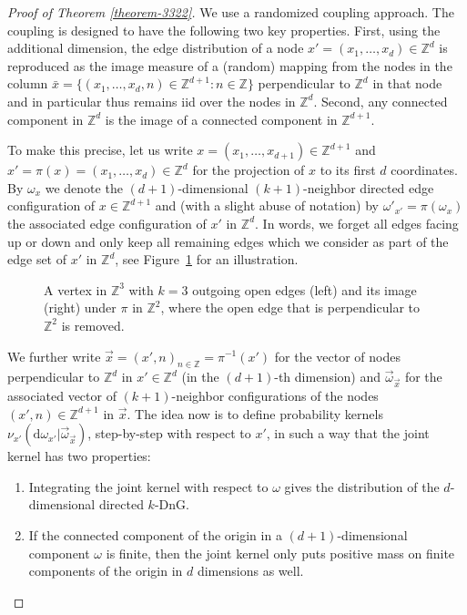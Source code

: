 \documentclass[a4paper, oneside, 11pt]{amsart}
\theoremstyle{definition}
\newcommand{\1}{\mathbbm{1}}
\newcommand{\0}{\mathbf{o}}
\renewcommand{\d}{\mathrm{d}}
\newcommand{\Z}{\mathbb{Z}}
\numberwithin{equation}{section}
\begin{document}
\begin{proof}[Proof of Theorem \ref{theorem-3322}]
    We use a randomized coupling approach. The coupling is designed to have the following two key properties. First, using the additional dimension, the edge distribution of a node $x'=(x_1,\dots,x_d)\in \Z^d$ is reproduced as the image measure of a (random) mapping from the nodes in the column $\bar x=\{(x_1,\dots,x_d,n)\in \Z^{d+1}\colon n\in \Z\}$ perpendicular to $\Z^d$ in that node and in particular thus remains iid over the nodes in $\Z^d$. Second, any connected component in $\Z^d$ is the image of a connected component in $\Z^{d+1}$.

To make this precise, let us write $x=(x_1,\dots,x_{d+1})\in \Z^{d+1}$ and $x'=\pi(x)=(x_1,\dots, x_d)\in \Z^d$ for the projection of $x$ to its first $d$ coordinates. By $\omega_{x}$ we denote the $(d+1)$-dimensional $(k+1)$-neighbor directed edge configuration of $x\in \Z^{d+1}$ and (with a slight abuse of notation) by $\omega'_{x'}=\pi(\omega_{x})$ the associated edge configuration of $x'$ in $\Z^d$. In words, we forget all edges facing up or down and only keep all remaining edges which we consider as part of the edge set of $x'$ in $\Z^d$, see Figure~\ref{fig_edgemap} for an illustration. 
\begin{figure}[h!]
\caption{A vertex in $\Z^3$ with $k=3$ outgoing open edges (left) and its image (right) under $\pi$ in $\Z^2$, where the open edge that is perpendicular to $\Z^2$ is removed.}\label{fig_edgemap}
\end{figure}



We further write $\vec{x}=(x',n)_{n\in\Z}=\pi^{-1}(x')$ for the vector of nodes perpendicular to $\Z^d$ in $x'\in\Z^d$ (in the $(d+1)$-th dimension) and $\vec\omega_{\vec x}$ for the associated vector of $(k+1)$-neighbor configurations of the nodes $(x',n)\in \Z^{d+1}$ in $\vec x$. The idea now is to define probability kernels $\nu_{x'}(\d \omega_{x'}|\vec\omega_{\vec x})$, step-by-step with respect to $x'$, in such a way that the joint kernel has two properties:
\begin{enumerate}
\item Integrating the joint kernel with respect to $\omega$ gives the distribution of the $d$-dimensional directed $k$-DnG. 
\item If the connected component of the origin in a $(d+1)$-dimensional component $\omega$ is finite, then the joint kernel only puts positive mass on finite components of the origin in $d$ dimensions as well. 
\end{enumerate}


\end{proof}
\end{document}
